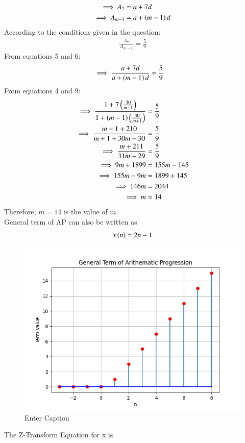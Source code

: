 \documentclass[journal,12pt,twocolumn]{IEEEtran}
\theoremstyle{remark}
\begin{document}
\begin{align}
\implies A_{7} &= a + 7d   \\ 
\implies A_{m-1} &= a + \left(m-1\right)d  
\end{align}
According to the conditions given in the question:
\begin{align}
\frac{A_{7}}{A_{m-1}} = \frac{5}{9} 
\end{align}
From equations 5 and 6:
\begin{align}
\implies \frac{a + 7d}{a + \left(m-1\right)d} &= \frac{5}{9} 
\end{align}
From equations 4 and 9:
\begin{align}
\implies \frac{1+7\left({\frac{30}{m+1}}\right)}{1+\left({m-1}\right)\left(\frac{30}{m+1}\right)} &= \frac{5}{9} \\
\implies \frac{m+1+210}{m+1+30m-30} &= \frac{5}{9}\\
\implies \frac{m+211}{31m-29} &= \frac{5}{9}\\
\implies 9m+1899 &=155m-145\\
\implies 155m-9m &=1899+145\\
\implies 146m &=2044\\
\implies m &=14
\end{align}
Therefore, $m = 14$ is the value of $m$.\\
General term of AP can also be written as 
\begin{align}
    x\left(n\right)=2n-1
\end{align}
\begin{figure}
    \centering
    \includegraphics[width=0.9\linewidth]{Figure_2.png}
    \caption{Enter Caption}
    \label{fig:enter-label}
\end{figure}
The Z-Transform Equation for x is 
\end{document}
